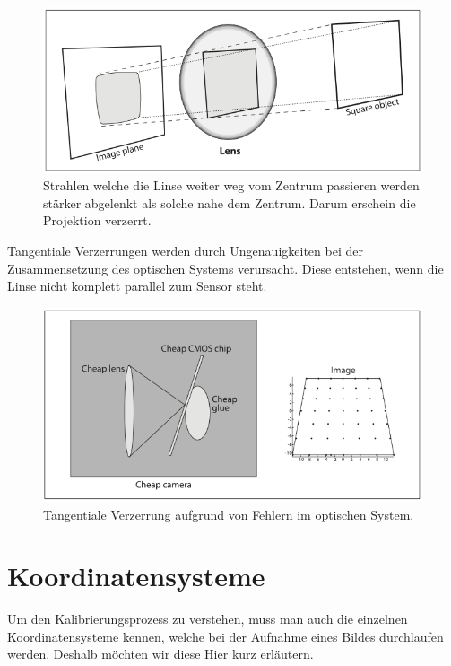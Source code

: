 \begin{figure}[!ht]
\centering
\includegraphics[scale=0.5]{images/radial-disortion.png} 
\caption{Strahlen welche die Linse weiter weg vom Zentrum passieren werden stärker abgelenkt als solche nahe dem Zentrum. Darum erschein die Projektion verzerrt.\protect\cite{learningopencv}}
\label{fig:radial-disortion}
\end{figure}
\noindent
Tangentiale Verzerrungen werden durch Ungenauigkeiten bei der Zusammensetzung des optischen Systems verursacht. Diese entstehen, wenn die Linse nicht komplett parallel zum Sensor steht.

\begin{figure}[!ht]
\centering
\includegraphics[scale=0.5]{images/tangential-disortion.png} 
\caption{Tangentiale Verzerrung aufgrund von Fehlern im optischen System.\protect\cite{learningopencv}}
\label{fig:tangential-disortion}
\end{figure}

\section{Koordinatensysteme}
Um den Kalibrierungsprozess zu verstehen, muss man auch die einzelnen Koordinatensysteme kennen, welche bei der Aufnahme eines Bildes durchlaufen werden. Deshalb möchten wir diese Hier kurz erläutern.

